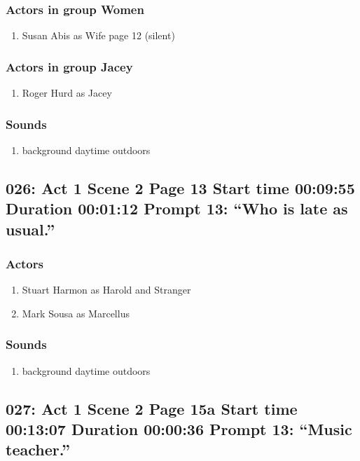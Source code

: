 \subsubsection{Actors in group Women}
\begin{enumerate}
\item Susan Abis as Wife page 12 (silent)
\end{enumerate}
\subsubsection{Actors in group Jacey}
\begin{enumerate}
\item Roger Hurd as Jacey
\end{enumerate}

\subsubsection{Sounds}
\begin{enumerate}
\item background daytime outdoors
\end{enumerate}
\subsection{026: Act 1 Scene 2 Page 13 Start time 00:09:55 Duration 00:01:12 Prompt 13: ``Who is late as usual.''}

\subsubsection{Actors}
\begin{enumerate}
\item Stuart Harmon as Harold and Stranger
\item Mark Sousa as Marcellus
\end{enumerate}

\subsubsection{Sounds}
\begin{enumerate}
\item background daytime outdoors
\end{enumerate}
\subsection{027: Act 1 Scene 2 Page 15a Start time 00:13:07 Duration 00:00:36 Prompt 13: ``Music teacher.''}

